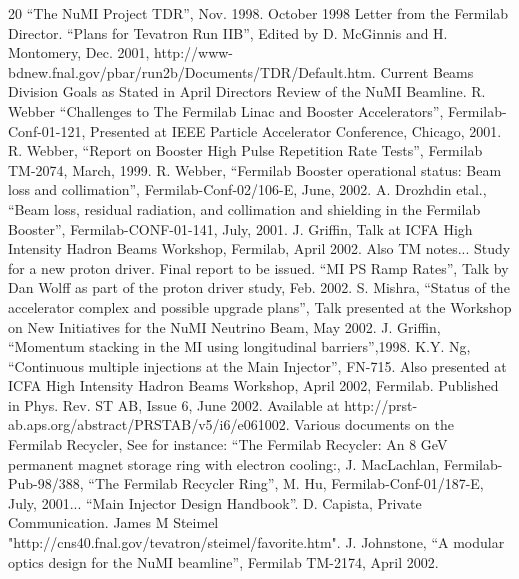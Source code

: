\documentclass{article}
\begin{document}
\begin {thebibliography}{20}
 ``The NuMI Project TDR'', Nov. 1998.
 October 1998 Letter from the Fermilab Director.
 ``Plans for Tevatron Run IIB'', Edited by D. McGinnis 
and H. Montomery, Dec. 2001, 
http://www-bdnew.fnal.gov/pbar/run2b/Documents/TDR/Default.htm.
 Current Beams Division Goals as Stated in April Directors
Review of the NuMI Beamline.
 R. Webber ``Challenges to The Fermilab Linac and Booster
Accelerators'', Fermilab-Conf-01-121, Presented at IEEE Particle Accelerator 
Conference, Chicago, 2001.
 R. Webber, ``Report on Booster High Pulse Repetition
Rate Tests'', Fermilab TM-2074, March, 1999.
 R. Webber, ``Fermilab Booster operational status: Beam
loss and collimation'', Fermilab-Conf-02/106-E, June, 2002.
 A. Drozhdin etal., ``Beam loss, residual radiation, and
collimation and shielding in the Fermilab Booster'', Fermilab-CONF-01-141,
July, 2001.
 J. Griffin, Talk at ICFA High Intensity Hadron Beams 
Workshop, Fermilab, April 2002. Also TM notes...
 Study for a new proton driver. Final report to be issued.
 ``MI PS Ramp Rates'', Talk by Dan Wolff as part of the
proton driver study, Feb. 2002.
 S. Mishra, ``Status of the accelerator complex and  
possible upgrade plans'', Talk presented at the Workshop on New Initiatives
for the NuMI Neutrino Beam, May 2002.
 J. Griffin, ``Momentum stacking in the MI using longitudinal
barriers'',1998.
 K.Y. Ng, ``Continuous multiple injections at the Main 
        Injector'', FN-715. Also presented at ICFA High Intensity Hadron
        Beams Workshop, April 2002, Fermilab.
        Published in Phys. Rev. ST AB, Issue 6, June 2002.
        Available at http://prst-ab.aps.org/abstract/PRSTAB/v5/i6/e061002.
 Various documents on the Fermilab Recycler, See for 
instance: ``The Fermilab Recycler: An 8 GeV permanent magnet storage ring with
electron cooling:, J. MacLachlan, Fermilab-Pub-98/388,
 ``The Fermilab Recycler Ring'', M. Hu, Fermilab-Conf-01/187-E, 
July, 2001... 
 ``Main Injector Design Handbook''.
 D. Capista, Private Communication.
James M Steimel "http://cns40.fnal.gov/tevatron/steimel/favorite.htm".
 J. Johnstone,
``A modular optics design for the NuMI beamline'', Fermilab TM-2174,
April 2002.


\end {thebibliography}
\end{document}
